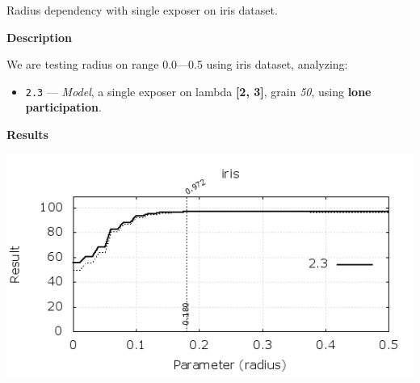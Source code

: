 \begin{experiment}{Radius dependency with single exposer on iris dataset.}{\small \sffamily\textbf{Description}

We are testing radius on range 0.0---0.5 using iris dataset, analyzing:

\begin{itemize}
\tightlist
	\item \texttt{2.3} --- \emph{Model}, a single exposer on lambda \textbf{[2, 3]}, grain \emph{50}, using \textbf{lone participation}.

\end{itemize}


\textbf{Results}

\centering
	\includegraphics[width=.75\textwidth]{plots/experiment_1_iris.png}
	\label{fig:experiment_1}
}\end{experiment}